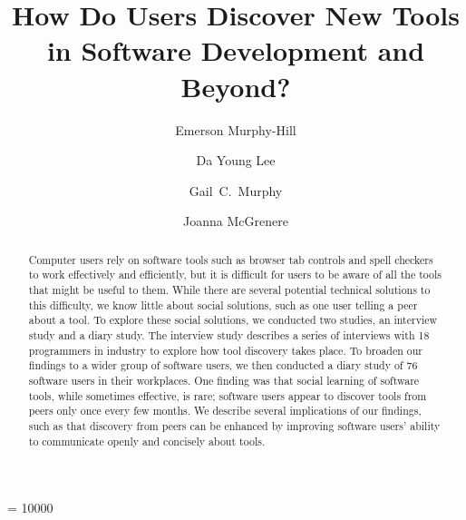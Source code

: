 \documentclass[smallextended]{svjour3}
\begin{document}
\widowpenalty = 10000


\title{How Do Users Discover New Tools\\in Software Development and Beyond?}

\author{Emerson Murphy-Hill         \and
        Da Young Lee \and
        Gail~C.~Murphy \and
        Joanna McGrenere
}



\maketitle

\begin{abstract}

Computer users rely on software tools such as browser tab controls and spell checkers to work effectively 
and efficiently, but it is difficult for users to be aware of all the tools that might be useful to them. 
While there are several potential technical solutions to this difficulty, we know little about social solutions, such as one user telling a peer about a tool.
To explore these social solutions, we conducted two studies, an interview study and a diary study.
The interview study describes a series of interviews with 18 programmers in industry to explore how tool discovery takes place. 
To broaden our findings to a wider group of software users, 
we then conducted a diary study of 76 software users in their workplaces.
One finding was that social learning of software tools, while sometimes effective, is rare;
software users appear to discover 
tools from peers only once every few months.
We describe several implications of our findings, such as that discovery from peers can 
be enhanced by improving software users' ability to communicate openly and concisely about tools.


\end{abstract}
\end{document}
